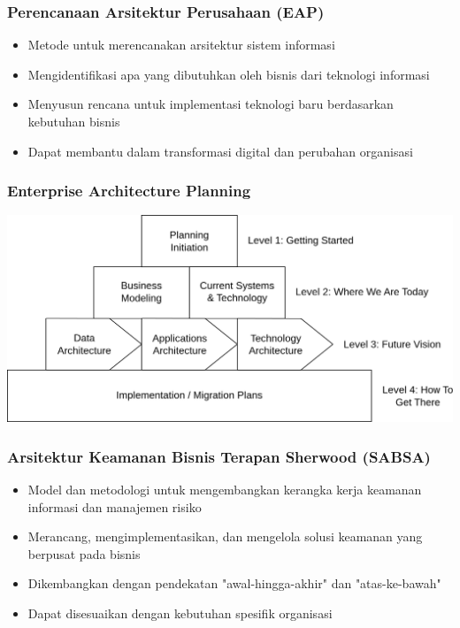 \documentclass{beamer}
\begin{document}
	\begin{frame}
		\frametitle{Perencanaan Arsitektur Perusahaan (EAP)}
		\begin{itemize}
			\item Metode untuk merencanakan arsitektur sistem informasi
			\item Mengidentifikasi apa yang dibutuhkan oleh bisnis dari teknologi informasi
			\item Menyusun rencana untuk implementasi teknologi baru berdasarkan kebutuhan bisnis
			\item Dapat membantu dalam transformasi digital dan perubahan organisasi
		\end{itemize}
	\end{frame}
	
	{
		\begin{frame}
			\frametitle{Enterprise Architecture Planning}
			\begin{center}
				\includegraphics[width=1\textwidth]{../figures/eap}
			\end{center}
		\end{frame}
	}

	\begin{frame}
		\frametitle{Arsitektur Keamanan Bisnis Terapan Sherwood (SABSA)}
		\begin{itemize}
			\item Model dan metodologi untuk mengembangkan kerangka kerja keamanan informasi dan manajemen risiko
			\item Merancang, mengimplementasikan, dan mengelola solusi keamanan yang berpusat pada bisnis
			\item Dikembangkan dengan pendekatan "awal-hingga-akhir" dan "atas-ke-bawah"
			\item Dapat disesuaikan dengan kebutuhan spesifik organisasi
		\end{itemize}
	\end{frame}
	
\end{document}

